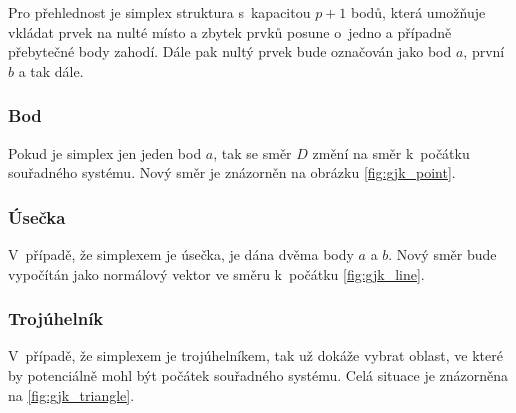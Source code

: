 Pro přehlednost je simplex struktura s~kapacitou $p+1$ bodů, která umožňuje vkládat prvek na nulté místo a zbytek prvků posune o~jedno a případně přebytečné body zahodí. Dále pak nultý prvek bude označován jako bod $a$, první $b$ a tak dále. 

\subsubsection{Bod}
Pokud je simplex jen jeden bod $a$, tak se směr $D$ změní na směr k~počátku souřadného systému. Nový směr je znázorněn na obrázku \ref{fig:gjk_point}.

\subsubsection{Úsečka}
V~případě, že simplexem je úsečka, je dána dvěma body $a$ a $b$. Nový směr bude vypočítán jako normálový vektor ve směru k~počátku
\ref{fig:gjk_line}.

\subsubsection{Trojúhelník}
V~případě, že simplexem je trojúhelníkem, tak už dokáže vybrat oblast, ve které by potenciálně mohl být počátek souřadného systému. Celá situace je znázorněna na \ref{fig:gjk_triangle}.


